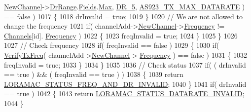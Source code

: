 \begin{DoxyCode}
      \mbox{\hyperlink{structs_channel_add_params_afc31493a105479490228fd896b20b45c}{NewChannel}}->\mbox{\hyperlink{structs_channel_params_ad4d9b041ea740886a05fa8a1d06997a2}{DrRange}}.\mbox{\hyperlink{unionu_dr_range_a5bdb9afc17112f2ae5f9548f0aee964f}{Fields}}.\mbox{\hyperlink{structu_dr_range_1_1s_fields_a5d03c6d792ca60d11ffc7e7a2cb59dd0}{Max}}, \mbox{\hyperlink{group___r_e_g_i_o_n_ga872e12c82020c02a7f70a1c6ed1375df}{DR\_5}}, 
      \mbox{\hyperlink{group___r_e_g_i_o_n_a_s923_gac9506097a516f03c7c86432d30e8f499}{AS923\_TX\_MAX\_DATARATE}} ) == \textcolor{keyword}{false} )
1017         \{
1018             drInvalid = \textcolor{keyword}{true};
1019         \}
1020         \textcolor{comment}{// We are not allowed to change the frequency}
1021         \textcolor{keywordflow}{if}( channelAdd->\mbox{\hyperlink{structs_channel_add_params_afc31493a105479490228fd896b20b45c}{NewChannel}}->\mbox{\hyperlink{structs_channel_params_ade3d190636488dad9a89b19446b7acf1}{Frequency}} != \mbox{\hyperlink{_region_a_s923_8c_a02bae2504563543865d6b0e81c48ab61}{Channels}}[\textcolor{keywordtype}{id}].
      \mbox{\hyperlink{structs_channel_params_ade3d190636488dad9a89b19446b7acf1}{Frequency}} )
1022         \{
1023             freqInvalid = \textcolor{keyword}{true};
1024         \}
1025     \}
1026 
1027     \textcolor{comment}{// Check frequency}
1028     \textcolor{keywordflow}{if}( freqInvalid == \textcolor{keyword}{false} )
1029     \{
1030         \textcolor{keywordflow}{if}( \mbox{\hyperlink{_region_a_s923_8c_af6b3cfa164d4105815aaaa55f02d723e}{VerifyTxFreq}}( channelAdd->\mbox{\hyperlink{structs_channel_add_params_afc31493a105479490228fd896b20b45c}{NewChannel}}->
      \mbox{\hyperlink{structs_channel_params_ade3d190636488dad9a89b19446b7acf1}{Frequency}} ) == \textcolor{keyword}{false} )
1031         \{
1032             freqInvalid = \textcolor{keyword}{true};
1033         \}
1034     \}
1035 
1036     \textcolor{comment}{// Check status}
1037     \textcolor{keywordflow}{if}( ( drInvalid == \textcolor{keyword}{true} ) && ( freqInvalid == \textcolor{keyword}{true} ) )
1038     \{
1039         \textcolor{keywordflow}{return} \mbox{\hyperlink{group___l_o_r_a_m_a_c_gga1d18f26b344040b3ec5c3db662919661a163a1a739baee13607068af42f2e9d30}{LORAMAC\_STATUS\_FREQ\_AND\_DR\_INVALID}};
1040     \}
1041     \textcolor{keywordflow}{if}( drInvalid == \textcolor{keyword}{true} )
1042     \{
1043         \textcolor{keywordflow}{return} \mbox{\hyperlink{group___l_o_r_a_m_a_c_gga1d18f26b344040b3ec5c3db662919661aa910e51ef7a7cf64c27dd3ffe5eb9d38}{LORAMAC\_STATUS\_DATARATE\_INVALID}};
1044     \}

\end{DoxyCode}
